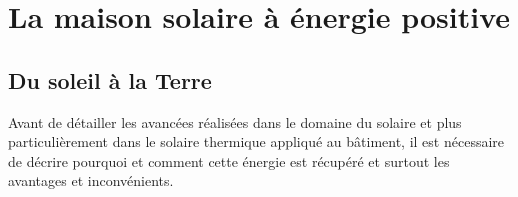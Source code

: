 \section{La maison solaire à énergie positive} %
\label{sec:la_maison_solaire_a_energie_positive}
\subsection{Du soleil à la Terre} %
\label{sub:du_soleil_a_la_terre}
Avant de détailler les avancées réalisées dans le domaine du solaire et plus particulièrement
dans le solaire thermique appliqué au bâtiment, il est nécessaire de décrire pourquoi
et comment cette énergie est récupéré et surtout les avantages et inconvénients.

